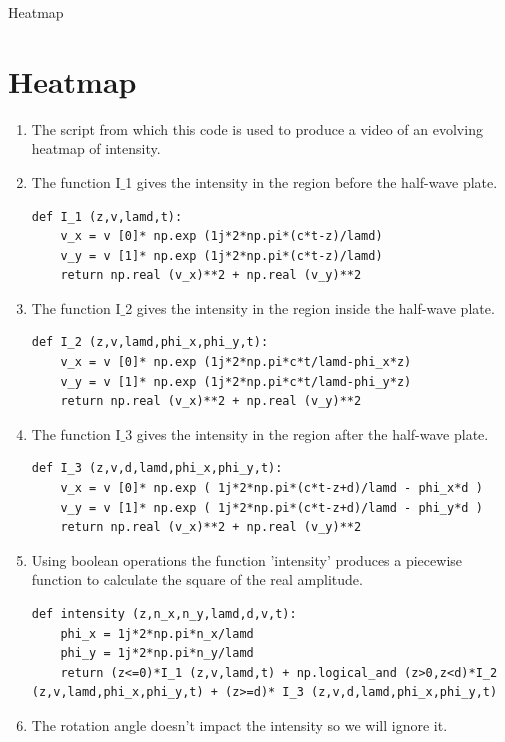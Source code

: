 \documentclass[12pt]{beamer}
\begin{document}
\begin{frame}{Heatmap}
\section{Heatmap}
\begin{enumerate}
	\item The script from which this code is used to produce a video of an evolving heatmap of intensity.
	\item The function I$\_$1 gives the intensity in the region before the half-wave plate.
\begin{lstlisting}
def I_1 (z,v,lamd,t):
    v_x = v [0]* np.exp (1j*2*np.pi*(c*t-z)/lamd)
    v_y = v [1]* np.exp (1j*2*np.pi*(c*t-z)/lamd)
    return np.real (v_x)**2 + np.real (v_y)**2
\end{lstlisting}
		\item The function I$\_$2 gives the intensity in the region inside the half-wave plate.
\begin{lstlisting}
def I_2 (z,v,lamd,phi_x,phi_y,t):
    v_x = v [0]* np.exp (1j*2*np.pi*c*t/lamd-phi_x*z)
    v_y = v [1]* np.exp (1j*2*np.pi*c*t/lamd-phi_y*z)
    return np.real (v_x)**2 + np.real (v_y)**2 
\end{lstlisting}
		\item The function I$\_$3 gives the intensity in the region after the half-wave plate.
\begin{lstlisting}
def I_3 (z,v,d,lamd,phi_x,phi_y,t):
    v_x = v [0]* np.exp ( 1j*2*np.pi*(c*t-z+d)/lamd - phi_x*d )
    v_y = v [1]* np.exp ( 1j*2*np.pi*(c*t-z+d)/lamd - phi_y*d )
    return np.real (v_x)**2 + np.real (v_y)**2
\end{lstlisting}
	\item Using boolean operations the function 'intensity' produces a piecewise function to calculate the square of the real amplitude.
\begin{lstlisting}
def intensity (z,n_x,n_y,lamd,d,v,t):
    phi_x = 1j*2*np.pi*n_x/lamd
    phi_y = 1j*2*np.pi*n_y/lamd
    return (z<=0)*I_1 (z,v,lamd,t) + np.logical_and (z>0,z<d)*I_2 (z,v,lamd,phi_x,phi_y,t) + (z>=d)* I_3 (z,v,d,lamd,phi_x,phi_y,t) 
\end{lstlisting}
	\item The rotation angle doesn't impact the intensity so we will ignore it.
\end{enumerate}
\end{frame}
\end{document}
